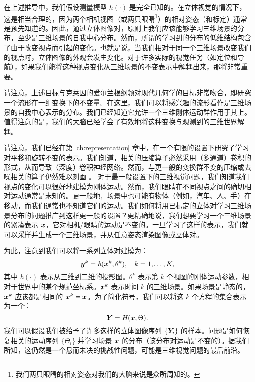 \documentclass[../../book-main.tex]{subfiles}
\begin{document}
在上述推导中，我们假设测量模型 $h(\cdot)$ 是完全已知的。在立体视觉的情况下，这是相当合理的，因为两个相机视图（或两只眼睛\footnote{我们两只眼睛的相对姿态对我们的大脑来说是众所周知的。}）的相对姿态（和标定）通常是预先知道的。因此，通过立体图像对，原则上我们应该能够学习三维场景的分布，至少是三维场景的自我中心分布。然而，所谓的学习到的分布的低维结构包含了由于改变视点而引起的变化。也就是说，当我们相对于同一个三维场景改变我们的视点时，立体图像的外观会发生变化。对于许多实际的视觉任务（如定位和导航），如果我们能将这种视点变化从三维场景的不变表示中解耦出来，那将非常重要。

\begin{remark}请注意，上述目标与克莱因的爱尔兰根纲领对现代几何学的目标非常吻合，即研究一个流形在一组变换下的不变量。在这里，我们可以将感兴趣的流形看作是三维场景的自我中心表示的分布。我们已经知道它允许一个三维刚体运动群作用于其上。值得注意的是，我们的大脑已经学会了有效地将这种变换与观测到的三维世界解耦。
\end{remark}


请注意，我们已经在第 \ref{ch:representation} 章中，在一个有限的设置下研究了学习对平移和旋转不变的表示。我们知道，相关的压缩算子必然采用（多通道）卷积的形式，从而导致（深度）卷积神经网络。然而，与更一般的变换群不变的压缩或去噪相关的算子仍然难以刻画 \cite{cohen2016group}。
对于最一般设置下的三维视觉问题，我们知道我们视点的变化可以很好地建模为刚体运动。然而，我们眼睛在不同视点之间的确切相对运动通常是未知的。更一般地，场景中也可能有物体（例如，汽车、人、手）在移动，而我们通常也不知道它们的运动。我们如何将用已标定的立体对学习三维场景分布的问题推广到这样更一般的设置？更精确地说，我们想要学习一个三维场景的紧凑表示 $\bm{x}$，它对相机/眼睛的运动是不变的。一旦学习了这样的表示，我们就可以采样并生成一个三维场景，并从任意姿态渲染图像或立体对。


为此，注意到我们可以将一系列立体对建模为：
\begin{equation}
    \bm{y}^k = h(\bm{x}^k, \theta^k), \quad k=1, \ldots, K,
\end{equation}
其中 $h(\cdot)$ 表示从三维到二维的投影图。$\theta^k$ 表示第 $k$ 个视图的刚体运动参数，相对于世界中的某个规范坐标系。$\bm{x}^k$ 表示时间 $k$ 的三维场景。如果场景是静态的，$\bm{x}^k$ 应该都是相同的 $\bm{x}^k = \bm{x}$。为了简化符号，我们可以将这 $k$ 个方程的集合表示为一个：
\begin{equation}
    \bm{Y} = H(\bm{x},\Theta). 
\end{equation}
我们可以假设我们被给予了许多这样的立体图像序列 $\{\bm{Y}_i\}$ 的样本。问题是如何恢复相关的运动序列 $\{\Theta_i\}$ 并学习场景 $\bm{x}$ 的分布（该分布对运动是不变的）。据我们所知，这仍然是一个悬而未决的挑战性问题，可能是三维视觉问题的最后前沿。
\end{document}
